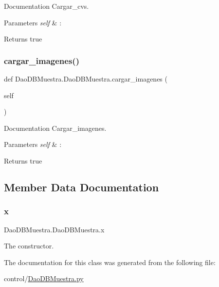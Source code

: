 Documentation Cargar\+\_\+cvs. 


\begin{DoxyParams}{Parameters}
{\em self} & \+: \\
\hline
\end{DoxyParams}
\begin{DoxyReturn}{Returns}
true 
\end{DoxyReturn}
\mbox{\label{class_dao_d_b_muestra_1_1_dao_d_b_muestra_a715cd7d4e90be2ee07152c6e9f28aef6}} 
\subsubsection{\texorpdfstring{cargar\+\_\+imagenes()}{cargar\_imagenes()}}
{\footnotesize\ttfamily def Dao\+D\+B\+Muestra.\+Dao\+D\+B\+Muestra.\+cargar\+\_\+imagenes (\begin{DoxyParamCaption}\item[{}]{self }\end{DoxyParamCaption})}



Documentation Cargar\+\_\+imagenes. 


\begin{DoxyParams}{Parameters}
{\em self} & \+: \\
\hline
\end{DoxyParams}
\begin{DoxyReturn}{Returns}
true 
\end{DoxyReturn}


\subsection{Member Data Documentation}
\mbox{\label{class_dao_d_b_muestra_1_1_dao_d_b_muestra_aa3ded640da73e60fd7371465deb482b6}} 
\subsubsection{\texorpdfstring{x}{x}}
{\footnotesize\ttfamily Dao\+D\+B\+Muestra.\+Dao\+D\+B\+Muestra.\+x}



The constructor. 



The documentation for this class was generated from the following file\+:\begin{DoxyCompactItemize}
\item 
control/\mbox{\hyperlink{_dao_d_b_muestra_8py}{Dao\+D\+B\+Muestra.\+py}}\end{DoxyCompactItemize}
